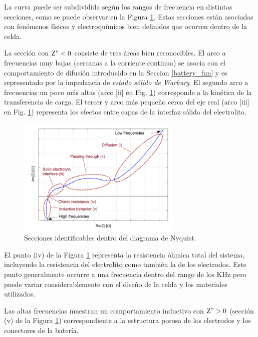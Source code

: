 \documentclass[10pt,a4paper]{article}
\begin{document}
\noindent La curva puede ser subdividida seg\'un los rangos de frecuencia en
distintas secciones, como se puede observar en la Figura
\ref{EIS_nyquist_sections}. Estas secciones est\'an asociadas con fen\'omenos
f\'isicos y electroqu\'imicos bien definidos que ocurren dentro de la celda.

\noindent La secci\'on con $\mathrm{Z" < 0}$ consiste de tres \'areas bien
reconocibles. El arco a frecuencias muy bajas (cercanas a la corriente continua)
se asocia con el comportamiento de difusi\'on introducido en la Seccion
\ref{battery_fun} y es representado por la impedancia de \emph{estado s\'olido
de Warburg}. El segundo arco a frecuencias un poco m\'as altas (arco [ii] en
Fig.  \ref{EIS_nyquist_sections}) corresponde a la kin\'etica de la
transferencia de carga. El tercer y arco m\'as pequeño cerca del eje real (arco
[iii] en Fig.  \ref{EIS_nyquist_sections}) representa los efectos entre capas de
la interfaz s\'olida del electrolito.

\begin{figure}[h!]
    \begin{center}
	\includegraphics[width=0.7\textwidth]{EIS_nyquist_section.png}
	\caption{Secciones identificables dentro del diagrama de Nyquist.}
	\label{EIS_nyquist_sections}
    \end{center}
\end{figure}
\FloatBarrier

\noindent El punto (iv) de la Figura \ref{EIS_nyquist_sections} representa la 
resistencia \'ohmica total del sistema, incluyendo la resistencia del 
electrolito como tambi\'en la de los electrodos. Este punto generalmente occurre 
a una frecuencia dentro del rango de los KHz pero puede variar considerablemente 
con el diseño de la celda y los materiales utilizados.

\noindent Las altas frecuencias muestran un comportamiento inductivo con 
$\mathrm{Z" > 0}$ (secci\'on (v) de la Figura \ref{EIS_nyquist_sections}) 
correspondiente a la estructura porosa de los electrodos y los conectores de la 
bater\'ia.
\end{document}
